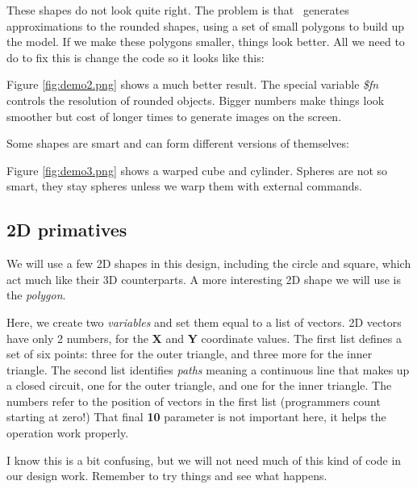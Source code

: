 These shapes do not look quite right. The problem is that \osc\  generates
approximations to the rounded shapes, using a set of small polygons to build up
the model. If we make these polygons smaller, things look better. All we need
to do to fix this is change the code so it looks like this:


Figure \ref{fig:demo2.png} shows a much better result. The special variable
{\it \$fn} controls the resolution of rounded objects. Bigger numbers make
things look smoother but cost of longer times to generate images on the screen.



Some shapes are smart and can form different versions of themselves:


Figure \ref{fig:demo3.png} shows a warped cube and cylinder. Spheres are not so
smart, they stay spheres unless we warp them with external commands.



\subsection*{2D primatives}

We will use a few 2D shapes in this design, including the circle and square,
which act much like their 3D counterparts. A more interesting 2D shape we will
use is the {\it polygon}.


Here, we create two {\it variables} and set them equal to a list of vectors. 2D
vectors have only 2 numbers, for the {\bf X} and {\bf Y} coordinate values. The
first list defines a set of six points: three for the outer triangle, and three
more for the inner triangle. The second list identifies {\it paths} meaning a
continuous line that makes up a closed circuit, one for the outer triangle, and
one for the inner triangle. The numbers refer to the position of vectors in the
first list (programmers count starting at zero!) That final {\bf 10} parameter
is not important here, it helps the operation work properly.

I know this is a bit confusing, but we will not need much of this kind of code
in our design work. Remember to try things and see what happens.


